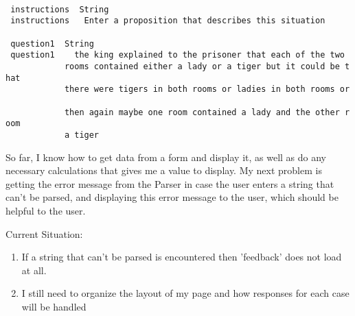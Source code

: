 \documentclass{article}
\begin{document}
\begin{tabbing}
\tt ~\\
\tt ~instructions~~String\\
\tt ~instructions~~~Enter~a~proposition~that~describes~this~situation~\\
\tt ~\\
\tt ~question1~~String\\
\tt ~question1~~~~the~king~explained~to~the~prisoner~that~each~of~the~two~\\
\tt ~~~~~~~~~~~~rooms~contained~either~a~lady~or~a~tiger~but~it~could~be~that~\\
\tt ~~~~~~~~~~~~there~were~tigers~in~both~rooms~or~ladies~in~both~rooms~or~\\
\tt ~~~~~~~~~~~~then~again~maybe~one~room~contained~a~lady~and~the~other~room~\\
\tt ~~~~~~~~~~~~a~tiger~~~~~~~
\end{tabbing}

So far, I know how to get data from a form and display it, as well as do any
necessary calculations that gives me a value to display. My next problem is
getting the error message from the Parser in case the user enters a string
that can't be parsed, and displaying this error message to the user, which
should be helpful to the user.

Current Situation: 
\begin{enumerate}
        \item If a string that can't be parsed is encountered then 'feedback' does
           not load at all.
        \item I still need to organize the layout of my page and how responses for
           each case will be handled
\end{enumerate}
\end{document}
